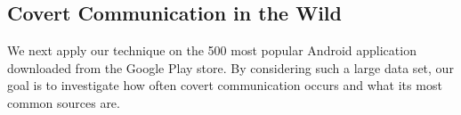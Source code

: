 \subsection{Covert Communication in the Wild}

We next apply our technique on the 500 most popular Android application
downloaded from the Google Play store. By considering such a large data set, our goal is to
investigate how often covert communication occurs and what its most common sources are.



